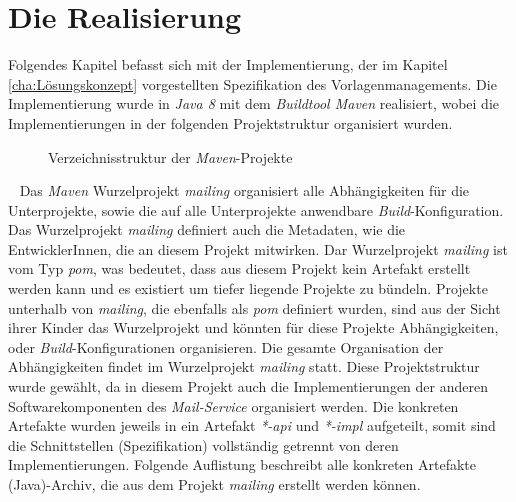 \chapter{Die Realisierung}
\label{cha:Realisierung}
Folgendes Kapitel befasst sich mit der Implementierung, der im Kapitel \ref{cha:Lösungskonzept} vorgestellten Spezifikation des Vorlagenmanagements. Die Implementierung wurde in \emph{Java 8} mit dem \emph{Buildtool Maven} realisiert, wobei die Implementierungen in der folgenden Projektstruktur organisiert wurden.
\begin{figure}[h]
\caption{Verzeichnisstruktur der \emph{Maven}-Projekte}
\label{fig:minimal-example:frame-dirtree}
\end{figure}
\ \newline
Das \emph{Maven} Wurzelprojekt \emph{mailing} organisiert alle Abhängigkeiten für die Unterprojekte, sowie die auf alle Unterprojekte anwendbare \emph{Build}-Konfiguration. Das Wurzelprojekt \emph{mailing} definiert auch die Metadaten, wie die EntwicklerInnen, die an diesem Projekt mitwirken. Dar Wurzelprojekt \emph{mailing} ist vom Typ \emph{pom}, was bedeutet, dass aus diesem Projekt kein Artefakt erstellt werden kann und es existiert um tiefer liegende Projekte zu bündeln. Projekte unterhalb von \emph{mailing}, die ebenfalls als \emph{pom} definiert wurden, sind aus der Sicht ihrer Kinder das Wurzelprojekt und könnten für diese Projekte Abhängigkeiten, oder \emph{Build}-Konfigurationen organisieren. Die gesamte Organisation der Abhängigkeiten findet im Wurzelprojekt \emph{mailing} statt. Diese Projektstruktur wurde gewählt, da in diesem Projekt auch die Implementierungen der anderen Softwarekomponenten des \emph{Mail-Service} organisiert werden. Die konkreten Artefakte wurden jeweils in ein Artefakt \emph{*-api} und \emph{*-impl} aufgeteilt, somit sind die Schnittstellen (Spezifikation) vollständig getrennt von deren Implementierungen. Folgende Auflistung beschreibt alle konkreten Artefakte (Java)-Archiv, die aus dem Projekt \emph{mailing} erstellt werden können.

